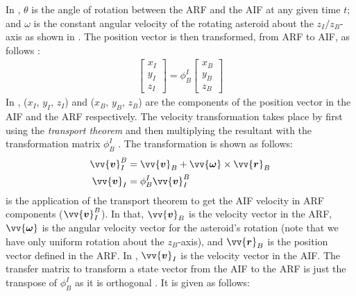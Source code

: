 In , $\theta$ is the angle of rotation between the \gls{ARF} and the \gls{AIF} at any given time $t$; and $\omega$ is the constant angular velocity of the rotating asteroid about the $z_I / z_B$-axis as shown in . The position vector is then transformed, from \gls{ARF} to \gls{AIF}, as follows \parencite{schaub2003Book}:
\begin{align}
    \begin{bmatrix}
        x_I \\
        y_I \\
        z_I
    \end{bmatrix}
    =
    \phi_{B}^{I}
    \begin{bmatrix}
        x_B \\
        y_B \\
        z_B
    \end{bmatrix}
    \label{eqn:arf_to_aif_position_transformation}
\end{align}
In , ($x_I$, $y_I$, $z_I$) and ($x_B$, $y_B$, $z_B$) are the components of the position vector in the \gls{AIF} and the \gls{ARF} respectively. The velocity transformation takes place by first using the \textit{transport theorem} and then multiplying the resultant with the transformation matrix $\phi_{B}^{I}$ \parencite{schaub2003Book}. The transformation is shown as follows:
\begin{align}
    \vv{\bm{v}}_{I}^{B} &= \vv{\bm{v}}_{B} + \vv{\bm{\omega}} \times \vv{\bm{r}}_{B}
    \label{eqn:arf_to_aif_transport_theorem} \\
    \vv{\bm{v}}_I &= \phi_B^I \vv{\bm{v}}_I^B
    \label{eqn:arf_to_aif_velocity_transformation}
\end{align}
 is the application of the transport theorem to get the \gls{AIF} velocity in \gls{ARF} components ($\vv{\bm{v}}_{I}^{B}$). In that, $\vv{\bm{v}}_{B}$ is the velocity vector in the \gls{ARF}, $\vv{\bm{\omega}}$ is the angular velocity vector for the asteroid's rotation (note that we have only uniform rotation about the $z_B$-axis), and $\vv{\bm{r}}_{B}$ is the position vector defined in the \gls{ARF}. In , $\vv{\bm{v}}_I$ is the velocity vector in the \gls{AIF}.
%
\newline\newline
%
The transfer matrix to transform a state vector from the \gls{AIF} to the \gls{ARF} is just the transpose of $\phi_B^I$ as it is orthogonal \parencite{schaub2003Book}. It is given as follows:
